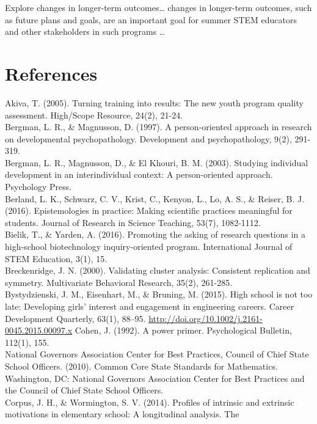 \documentclass[]{book}
\theoremstyle{definition}
\theoremstyle{definition}
\theoremstyle{definition}
\theoremstyle{remark}
\begin{document}
Explore changes in longer-term outcomes\ldots{} changes in longer-term
outcomes, such as future plans and goals, are an important goal for
summer STEM educators and other stakeholders in such programs \ldots{}

\newpage

\chapter{References}\label{references}

Akiva, T. (2005). Turning training into results: The new youth program
quality assessment. High/Scope Resource, 24(2), 21-24.\\
Bergman, L. R., \& Magnusson, D. (1997). A person-oriented approach in
research on developmental psychopathology. Development and
psychopathology, 9(2), 291-319.\\
Bergman, L. R., Magnusson, D., \& El Khouri, B. M. (2003). Studying
individual development in an interindividual context: A person-oriented
approach. Psychology Press.\\
Berland, L. K., Schwarz, C. V., Krist, C., Kenyon, L., Lo, A. S., \&
Reiser, B. J. (2016). Epistemologies in practice: Making scientific
practices meaningful for students. Journal of Research in Science
Teaching, 53(7), 1082-1112.\\
Bielik, T., \& Yarden, A. (2016). Promoting the asking of research
questions in a high-school biotechnology inquiry-oriented program.
International Journal of STEM Education, 3(1), 15.\\
Breckenridge, J. N. (2000). Validating cluster analysis: Consistent
replication and symmetry. Multivariate Behavioral Research, 35(2),
261-285.\\
Bystydzienski, J. M., Eisenhart, M., \& Bruning, M. (2015). High school
is not too late: Developing girls' interest and engagement in
engineering careers. Career Development Quarterly, 63(1), 88--95.
\url{http://doi.org/10.1002/j.2161-0045.2015.00097.x} Cohen, J. (1992).
A power primer. Psychological Bulletin, 112(1), 155.\\
National Governors Association Center for Best Practices, Council of
Chief State School Officers. (2010). Common Core State Standards for
Mathematics. Washington, DC: National Governors Association Center for
Best Practices and the Council of Chief State School Officers.\\
Corpus, J. H., \& Wormington, S. V. (2014). Profiles of intrinsic and
extrinsic motivations in elementary school: A longitudinal analysis. The
\end{document}
